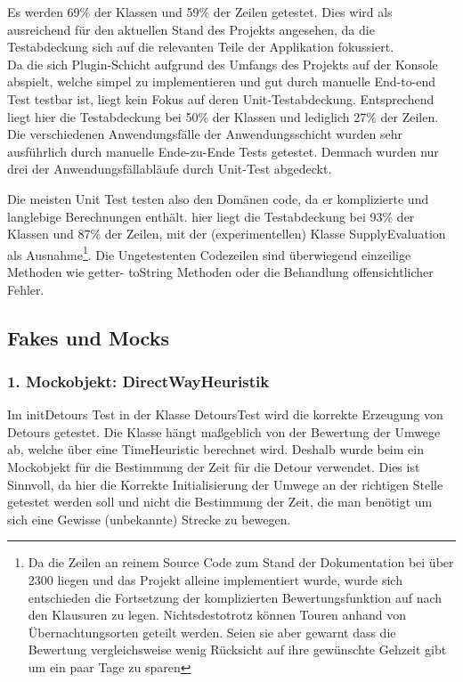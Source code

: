 Es werden 69\% der Klassen und 59\% der Zeilen getestet. 
Dies wird als ausreichend für den aktuellen Stand des Projekts angesehen, da die Testabdeckung sich auf die relevanten Teile der Applikation fokussiert.\\

Da die sich Plugin-Schicht aufgrund des Umfangs des Projekts auf der Konsole abspielt, welche simpel zu implementieren und gut durch manuelle End-to-end Test testbar ist, liegt kein Fokus auf deren Unit-Testabdeckung. Entsprechend liegt hier die Testabdeckung bei 50\% der Klassen und lediglich 27\% der Zeilen.\\

Die verschiedenen Anwendungsfälle der Anwendungsschicht wurden sehr ausführlich durch manuelle Ende-zu-Ende Tests getestet. Demnach wurden nur drei der Anwendungsfällabläufe durch Unit-Test abgedeckt.

 Die meisten Unit Test testen also den Domänen code, da er komplizierte und langlebige Berechnungen enthält. hier liegt die Testabdeckung bei 93\% der Klassen und 87\% der Zeilen, mit der (experimentellen) Klasse SupplyEvaluation als Ausnahme\footnote{Da die Zeilen an reinem Source Code zum Stand der Dokumentation bei über 2300 liegen und das Projekt alleine implementiert wurde, wurde sich entschieden die Fortsetzung der komplizierten Bewertungsfunktion auf nach den Klausuren zu legen. Nichtsdestotrotz können Touren anhand von Übernachtungsorten geteilt werden. Seien sie aber gewarnt dass die Bewertung vergleichsweise wenig Rücksicht auf ihre gewünschte Gehzeit gibt um ein paar Tage zu sparen}.
 Die Ungetestenten Codezeilen sind überwiegend einzeilige Methoden wie getter- toString Methoden oder die Behandlung offensichtlicher Fehler.

\subsection{Fakes und Mocks}
 
 \subsubsection{1. Mockobjekt: DirectWayHeuristik}
 
 Im initDetours Test in der Klasse DetoursTest wird die korrekte Erzeugung von Detours getestet.
 Die Klasse hängt maßgeblich von der Bewertung der Umwege ab, welche über eine TimeHeuristic berechnet wird. 
 Deshalb wurde beim ein Mockobjekt für die Bestimmung der Zeit für die Detour verwendet.
 Dies ist Sinnvoll, da hier die Korrekte Initialisierung der Umwege an der richtigen Stelle getestet werden soll und nicht die Bestimmung der Zeit, die man benötigt um sich eine Gewisse (unbekannte) Strecke zu bewegen.
 
